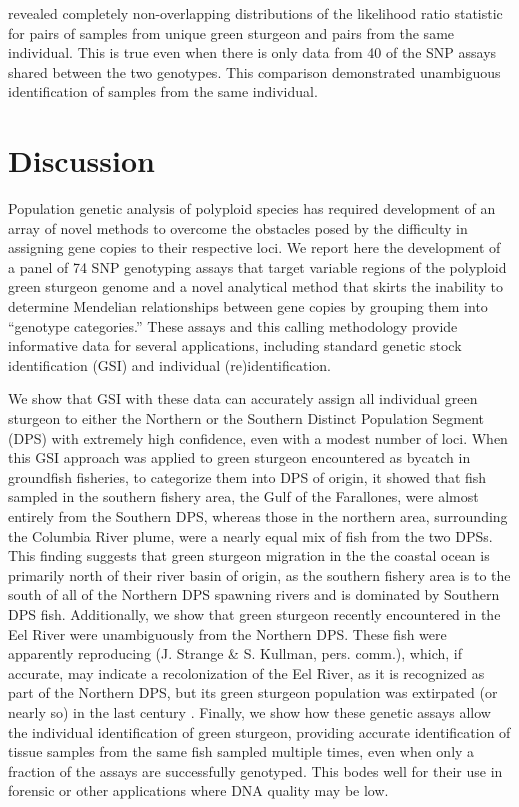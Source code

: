 \documentclass[twocolumn,natbib]{svjour3}       %
\begin{document}
revealed completely non-overlapping distributions of the likelihood ratio
statistic for pairs of samples from unique green sturgeon and pairs from the same
individual. This is true even when there is only data from 40 
of the SNP assays shared between the two genotypes.
This comparison
demonstrated unambiguous identification of samples from the same individual.




\section{Discussion}


Population genetic analysis of polyploid species has required development of an array of novel 
methods to overcome the obstacles posed by the difficulty in assigning gene copies to their 
respective loci. We report here the development of a panel of 74 SNP genotyping assays that 
target variable regions of the polyploid green sturgeon genome and a novel analytical method 
that skirts the inability to determine Mendelian relationships between gene copies by grouping 
them into ``genotype categories.'' These assays and this calling methodology provide informative 
data for several applications, including standard genetic stock identification (GSI) and 
individual (re)identification. 

We show that GSI with these data can accurately assign all 
individual green sturgeon to either the Northern or the Southern Distinct Population Segment (DPS) 
with extremely high confidence, even with a modest number of loci. When this GSI approach 
was applied to green sturgeon encountered as bycatch in groundfish fisheries, to categorize 
them into DPS of origin, it showed that fish sampled in the southern fishery area, the 
Gulf of the Farallones, were almost entirely from the Southern DPS, whereas those in the 
northern area, surrounding the Columbia River plume, were a nearly equal mix of fish from 
the two DPSs. 
This finding suggests that green sturgeon migration in the the coastal ocean is primarily north of their river basin of origin, as the southern fishery area is to the south of all of the Northern DPS spawning rivers and is dominated by Southern DPS fish.
Additionally, we show that green sturgeon recently encountered in the Eel River
were unambiguously 
from the Northern DPS. These fish were apparently reproducing (J. Strange \& S. Kullman, pers. comm.), 
which, if accurate, may indicate a recolonization of the Eel River, as it is recognized as
part of the Northern DPS, but its green sturgeon population was extirpated (or nearly so) in the last century \citep{adams2007population}. 
Finally, we show how these 
genetic assays allow the individual identification of green sturgeon, providing accurate 
identification of tissue samples from the same fish sampled multiple times, even when 
only a fraction of the assays are successfully genotyped. This bodes well for their 
use in forensic or other applications where DNA quality may be low. 
\end{document}
